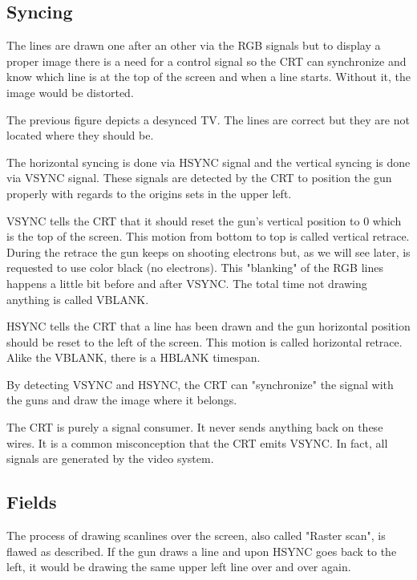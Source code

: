\subsection{Syncing}
The lines are drawn one after an other via the RGB signals but to display a proper image there is a need for a control signal so the CRT can synchronize and know which line is at the top of the screen and when a line starts. Without it, the image would be distorted. 



The previous figure depicts a desynced TV. The lines are correct but they are not located where they should be.

The horizontal syncing is done via HSYNC signal and the vertical syncing is done via VSYNC signal. These signals are detected by the CRT to position the gun properly with regards to the origins sets in the upper left.

VSYNC tells the CRT that it should reset the gun's vertical position to 0 which is the top of the screen. This motion from bottom to top is called vertical retrace. During the retrace the gun keeps on shooting electrons but, as we will see later, is requested to use color black (no electrons). This "blanking" of the RGB lines happens a little bit before and after VSYNC. The total time not drawing anything is called VBLANK.

HSYNC tells the CRT that a line has been drawn and the gun horizontal position should be reset to the left of the screen. This motion is called horizontal retrace. Alike the VBLANK, there is a HBLANK timespan.

By detecting VSYNC and HSYNC, the CRT can "synchronize" the signal with the guns and draw the image where it belongs.


\begin{trivia} The CRT is purely a signal consumer. It never sends anything back on these wires. It is a common misconception that the CRT emits VSYNC. In fact, all signals are generated by the video system.
\end{trivia}


\subsection{Fields}

The process of drawing scanlines over the screen, also called "Raster scan", is flawed as described. If the gun draws a line and upon HSYNC goes back to the left, it would be drawing the same upper left line over and over again. 

